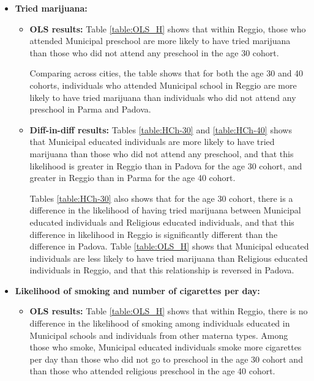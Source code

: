 \documentclass[11pt]{article}
\begin{document}
\begin{itemize}
\item \textbf{Tried marijuana:} 
	
	\begin{itemize}
	\item \textbf{OLS results:} Table \ref{table:OLS_H} shows that within Reggio, those who attended Municipal preschool are more likely to have tried marijuana than those who did not attend any preschool in the age 30 cohort.

	Comparing across cities, the table shows that for both the age 30 and 40 cohorts, individuals who attended Municipal school in Reggio are more likely to have tried marijuana than individuals who did not attend any preschool in Parma and Padova.
		
	\item \textbf{Diff-in-diff results:} Tables  \ref{table:HCh-30} and  \ref{table:HCh-40} shows that Municipal educated individuals are more likely to have tried marijuana than those who did not attend any preschool, and that this likelihood is greater in Reggio than in Padova for the age 30 cohort, and greater in Reggio than in Parma for the age 40 cohort.
	
	Tables  \ref{table:HCh-30} also shows that for the age 30 cohort, there is a difference in the likelihood of having tried marijuana between Municipal educated individuals and Religious educated individuals, and that this difference in likelihood in Reggio is significantly different than the difference in Padova. Table \ref{table:OLS_H} shows that Municipal educated individuals are less likely to have tried marijuana than Religious educated individuals in Reggio, and that this relationship is reversed in Padova.
	\end{itemize}

\item \textbf{Likelihood of smoking and number of cigarettes per day:} 
	
	\begin{itemize}
	\item \textbf{OLS results:} Table  \ref{table:OLS_H} shows that within Reggio, there is no difference in the likelihood of smoking among individuals educated in Municipal schools and individuals from other materna types. Among those who smoke, Municipal educated individuals smoke more cigarettes per day than those who did not go to preschool in the age 30 cohort and than those who attended religious preschool in the age 40 cohort.


\end{itemize}
\end{itemize}
\end{document}
